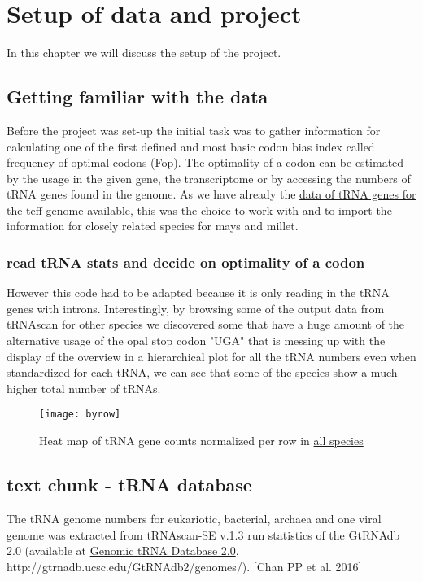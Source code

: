 \chapter{Setup of data and project}
In this chapter we will discuss the setup of the project.

\section{Getting familiar with the data}
Before the project was set-up the initial task was to gather information for calculating one of the first defined and most basic codon bias index called \hyperlink{function:Fop}{frequency of optimal codons (Fop)}. The optimality of a codon can be estimated by the usage in the given gene, the transcriptome or by accessing the numbers of tRNA genes found in the genome. As we have already the \hyperlink{data:tRNAlist}{data of tRNA genes for the teff genome} available, this was the choice to work with and to import the information for closely related species for mays and millet.

\subsection{read tRNA stats and decide on optimality of a codon}
  
      
 
However this code had to be adapted because it is only reading in the tRNA genes with introns. Interestingly, by browsing some of the output data from tRNAscan for other species we discovered some that have a huge amount of the alternative usage of the opal stop codon "UGA" that is messing up with the display of the overview in a hierarchical plot for all the tRNA numbers even when standardized for each tRNA, we can see that some of the species show a much higher total number of tRNAs. 

\begin{figure}[tb] 
\centering 
\texttt{[image: byrow]} 
\caption[Heat map for tRNA counts]{Heat map of tRNA gene counts normalized per row in \hyperlink{data:veab}{all species}}
\label{fig:byrow} 
\end{figure}

\section{text chunk - tRNA database}
The tRNA genome numbers for eukariotic, bacterial, archaea and one viral genome was extracted from tRNAscan-SE v.1.3 run statistics of the GtRNAdb 2.0 (available at
\href{http://gtrnadb.ucsc.edu/GtRNAdb2/genomes/}{Genomic tRNA Database 2.0}, http://gtrnadb.ucsc.edu/GtRNAdb2/genomes/). \cite{Chan2016}[Chan PP et al. 2016]

